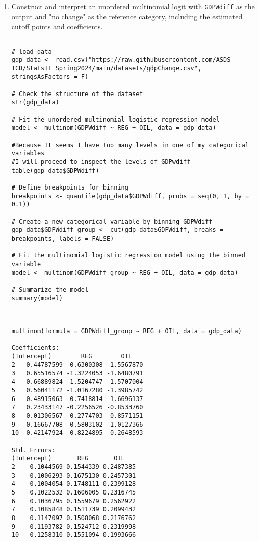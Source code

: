 \documentclass[12pt,letterpaper]{article}
\begin{document}
\begin{enumerate}
	\item Construct and interpret an unordered multinomial logit with \texttt{GDPWdiff} as the output and "no change" as the reference category, including the estimated cutoff points and coefficients.
	
\begin{lstlisting}	

# load data
gdp_data <- read.csv("https://raw.githubusercontent.com/ASDS-TCD/StatsII_Spring2024/main/datasets/gdpChange.csv", stringsAsFactors = F)

# Check the structure of the dataset
str(gdp_data)

# Fit the unordered multinomial logistic regression model
model <- multinom(GDPWdiff ~ REG + OIL, data = gdp_data)

#Because It seems I have too many levels in one of my categorical variables
#I will proceed to inspect the levels of GDPwdiff
table(gdp_data$GDPWdiff)

# Define breakpoints for binning
breakpoints <- quantile(gdp_data$GDPWdiff, probs = seq(0, 1, by = 0.1)) 

# Create a new categorical variable by binning GDPWdiff
gdp_data$GDPWdiff_group <- cut(gdp_data$GDPWdiff, breaks = breakpoints, labels = FALSE)

# Fit the multinomial logistic regression model using the binned variable
model <- multinom(GDPWdiff_group ~ REG + OIL, data = gdp_data)

# Summarize the model
summary(model)
	
\end{lstlisting}	
	
\newpage	
\begin{verbatim}

multinom(formula = GDPWdiff_group ~ REG + OIL, data = gdp_data)

Coefficients:
(Intercept)        REG        OIL
2   0.44787599 -0.6300308 -1.5567870
3   0.65516574 -1.3224053 -1.6480791
4   0.66889824 -1.5204747 -1.5707004
5   0.56041172 -1.0167280 -1.3985742
6   0.48915063 -0.7418814 -1.6696137
7   0.23433147 -0.2256526 -0.8533760
8  -0.01306567  0.2774703 -0.8571151
9  -0.16667708  0.5803102 -1.0127366
10 -0.42147924  0.8224895 -0.2648593

Std. Errors:
(Intercept)       REG       OIL
2    0.1044569 0.1544339 0.2487385
3    0.1006293 0.1675130 0.2457301
4    0.1004054 0.1748111 0.2399128
5    0.1022532 0.1606005 0.2316745
6    0.1036795 0.1559679 0.2562922
7    0.1085848 0.1511739 0.2099432
8    0.1147097 0.1508068 0.2176762
9    0.1193782 0.1524712 0.2319998
10   0.1258310 0.1551094 0.1993666


\end{verbatim}
\end{enumerate}
\end{document}
